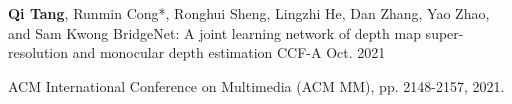 
\begin{cventries}
    \pcventry
    {\textbf{Qi Tang}, Runmin Cong*, Ronghui Sheng, Lingzhi He, Dan Zhang, Yao Zhao, and Sam Kwong} %
    {BridgeNet: A joint learning network of depth map super-resolution and monocular depth estimation \href{https://dl.acm.org/doi/pdf/10.1145/3474085.3475373}{{\color{awesome}\faFilePdf[regular]}}
    } %
    {CCF-A} %
    {Oct. 2021} %
    {
        \begin{cvitems} %
            \item {ACM International Conference on Multimedia (ACM MM), pp. 2148-2157, 2021.}
        \end{cvitems}
    }
\end{cventries}
